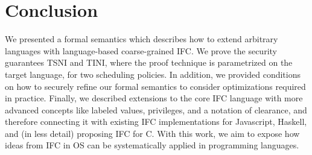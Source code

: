 \section{Conclusion}
\label{sec:conclusion}

We presented a formal semantics which describes how to extend arbitrary languages
with language-based coarse-grained IFC. We prove the security guarantees
TSNI and TINI, where the proof technique is parametrized on the
target language, for two scheduling policies. In
addition, we provided conditions on how to securely refine our formal semantics to
consider optimizations required in practice. Finally, we described extensions to
the core IFC language with more advanced concepts like labeled values, privileges,
and a notation of clearance, and therefore connecting it with existing
IFC implementations for Javascript, Haskell, and (in
less detail) proposing IFC for C. With this work, we aim to expose how ideas
from IFC in OS can be systematically applied in programming languages.


